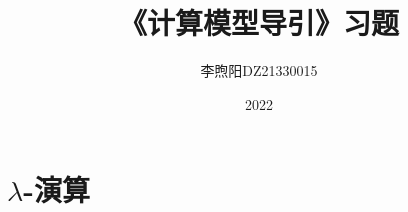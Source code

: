 \documentclass[11pt]{ctexart}
\title{\bf 《计算模型导引》习题}
\author{李煦阳\quad DZ21330015}
\date{2022}
\begin{document}
\maketitle


\clearpage


\section{$\lambda$-演算}
\bigskip
\bigskip
\bigskip
\bigskip

\bigskip
\bigskip






\newpage
\end{document}
